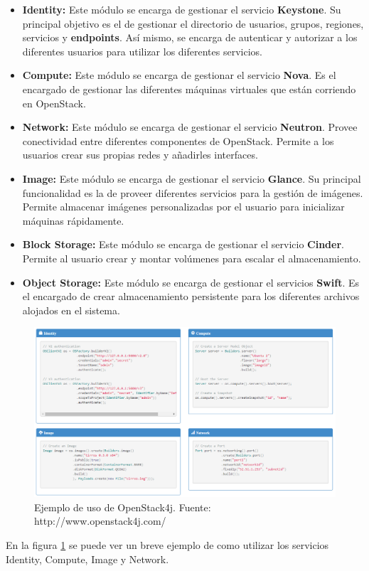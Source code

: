 \begin{itemize}
	\item \textbf{Identity:} Este módulo se encarga de gestionar el servicio \textbf{Keystone}. Su principal objetivo es el de gestionar el directorio de usuarios, grupos, regiones, servicios y \textbf{endpoints}. Así mismo, se encarga de autenticar y autorizar a los diferentes usuarios para utilizar los diferentes servicios.
	
	\item \textbf{Compute:} Este módulo se encarga de gestionar el servicio \textbf{Nova}. Es el encargado de gestionar las diferentes máquinas virtuales que están corriendo en OpenStack.
	
	\item \textbf{Network:} Este módulo se encarga de gestionar el servicio \textbf{Neutron}. Provee conectividad entre diferentes componentes de OpenStack. Permite a los usuarios crear sus propias redes y añadirles interfaces.
	
	\item \textbf{Image:} Este módulo se encarga de gestionar el servicio \textbf{Glance}. Su principal funcionalidad es la de proveer diferentes servicios para la gestión de imágenes. Permite almacenar imágenes personalizadas por el usuario para inicializar máquinas rápidamente.
	
	\item \textbf{Block Storage:} Este módulo se encarga de gestionar el servicio \textbf{Cinder}. Permite al usuario crear y montar volúmenes para escalar el almacenamiento.
	
	\item \textbf{Object Storage:} Este módulo se encarga de gestionar el servicios \textbf{Swift}. Es el encargado de crear almacenamiento persistente para los diferentes archivos alojados en el sistema.
\end{itemize}


\begin{figure}[!ht]
	\centering
	\includegraphics[width=0.8\linewidth]{imagenes/ejemplo_os4j}
	\caption{Ejemplo de uso de OpenStack4j. Fuente: http://www.openstack4j.com/}
	\label{fig:ejemploos4j}
\end{figure}

En la figura \ref{fig:ejemploos4j} se puede ver un breve ejemplo de como utilizar los servicios Identity, Compute, Image y Network.




\cleardoublepage
